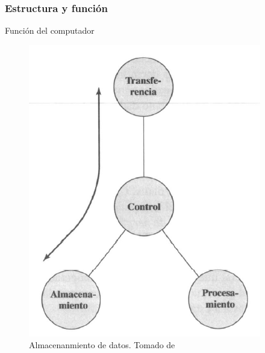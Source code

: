 \documentclass{beamer}
\begin{document}
	\begin{frame}
 		\frametitle{Estructura y función}
		\begin{block}{Función del computador}
\begin{figure}[H]
\centering
\includegraphics[scale=0.4]{imagenes/pc5.png}
\caption{Almacenanmiento de datos. Tomado de \cite{stallings}}
\end{figure}
		\end{block}
	\end{frame}
	
\end{document}
